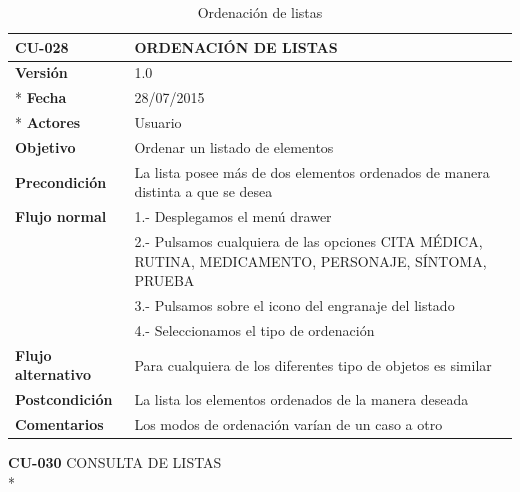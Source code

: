 \documentclass[../pfc.tex]{subfiles}
\begin{document}
		\begin{table}[H]
			\centering
			\begin{tabular}[t]{|p{3cm}|p{9.5cm}|}
				\hline \textbf{CU-028} & \textbf{ORDENACIÓN DE LISTAS} \\*
				\hline\hline \textbf{Versión} & 1.0 \\ *
				\hline\hline \textbf{Fecha} & 28/07/2015 \\ *
				\hline\textbf{Actores} 	& Usuario\\*
				\hline \textbf{Objetivo} & Ordenar un listado de elementos\\* 			
				\hline \textbf{Precondición} & La lista posee más de dos elementos ordenados de manera distinta a que se desea\\* 
				\hline \textbf{Flujo normal} & 1.- Desplegamos el menú drawer \\* 
				& 2.- Pulsamos cualquiera de las opciones CITA MÉDICA, RUTINA, MEDICAMENTO, PERSONAJE, SÍNTOMA, PRUEBA\\*	
				& 3.- Pulsamos sobre el icono del engranaje del listado\\*	
				& 4.- Seleccionamos el tipo de ordenación\\*	
				\hline \textbf{Flujo alternativo} & Para cualquiera de los diferentes tipo de objetos es similar \\* 
				\hline \textbf{Postcondición} & La lista los elementos ordenados de la manera deseada\\* 
				\hline \textbf{Comentarios}   & Los modos de ordenación varían de un caso a otro\\*
				\hline
			\end{tabular}
			\caption{Ordenación de listas}
			\label{tabla:caso029}
		\end{table}

	\textbf{CU-030}	CONSULTA DE LISTAS\\* 
	
\end{document}
